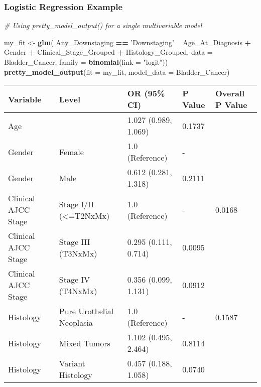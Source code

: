 \documentclass[table]{article}
\newenvironment{Shaded}{\begin{snugshade}}{\end{snugshade}}
\newcommand{\CommentTok}[1]{\textcolor[rgb]{0.56,0.35,0.01}{\textit{#1}}}
\newcommand{\DataTypeTok}[1]{\textcolor[rgb]{0.13,0.29,0.53}{#1}}
\newcommand{\KeywordTok}[1]{\textcolor[rgb]{0.13,0.29,0.53}{\textbf{#1}}}
\newcommand{\NormalTok}[1]{#1}
\newcommand{\OperatorTok}[1]{\textcolor[rgb]{0.81,0.36,0.00}{\textbf{#1}}}
\newcommand{\StringTok}[1]{\textcolor[rgb]{0.31,0.60,0.02}{#1}}
\begin{document}
\clearpage

\hypertarget{logistic-regression-example}{%
\subsubsection{Logistic Regression
Example}\label{logistic-regression-example}}

\begin{Shaded}
\begin{Highlighting}[]
\CommentTok{# Using pretty_model_output() for a single multivariable model}

\NormalTok{my_fit <-}\StringTok{ }\KeywordTok{glm}\NormalTok{(}
\NormalTok{  Any_Downstaging }\OperatorTok{==}\StringTok{ 'Downstaging'} \OperatorTok{~}\StringTok{ }\NormalTok{Age_At_Diagnosis }\OperatorTok{+}\StringTok{ }\NormalTok{Gender }\OperatorTok{+}\StringTok{ }\NormalTok{Clinical_Stage_Grouped }\OperatorTok{+}\StringTok{ }
\StringTok{    }\NormalTok{Histology_Grouped, }\DataTypeTok{data =}\NormalTok{ Bladder_Cancer, }\DataTypeTok{family =} \KeywordTok{binomial}\NormalTok{(}\DataTypeTok{link =} \StringTok{"logit"}\NormalTok{))}
\KeywordTok{pretty_model_output}\NormalTok{(}\DataTypeTok{fit =}\NormalTok{ my_fit, }\DataTypeTok{model_data =}\NormalTok{ Bladder_Cancer)}
\end{Highlighting}
\end{Shaded}

\begin{tabular}{l|l|l|l|l}
\hline
Variable & Level & OR (95\% CI) & P Value & Overall P Value\\
\hline
Age &  & 1.027 (0.989, 1.069) & 0.1737 & \\
\hline
Gender & Female & 1.0 (Reference) & - & \\
\hline
Gender & Male & 0.612 (0.281, 1.318) & 0.2111 & \\
\hline
Clinical AJCC Stage & Stage I/II (<=T2NxMx) & 1.0 (Reference) & - & 0.0168\\
\hline
Clinical AJCC Stage & Stage III (T3NxMx) & 0.295 (0.111, 0.714) & 0.0095 & \\
\hline
Clinical AJCC Stage & Stage IV (T4NxMx) & 0.356 (0.099, 1.131) & 0.0912 & \\
\hline
Histology & Pure Urothelial Neoplasia & 1.0 (Reference) & - & 0.1587\\
\hline
Histology & Mixed Tumors & 1.102 (0.495, 2.464) & 0.8114 & \\
\hline
Histology & Variant Histology & 0.457 (0.188, 1.058) & 0.0740 & \\
\hline
\end{tabular}
\end{document}
